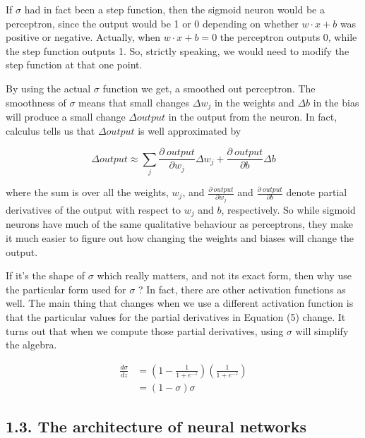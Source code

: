 \documentclass[12 pt]{article}
\begin{document}
If $ \sigma $ had in fact been a step function, then the sigmoid
neuron would be a perceptron, since the output would be 1 or 0 depending
on whether $ w \cdot x + b $ was positive or negative. Actually, when
$ w \cdot x + b = 0 $ the perceptron outputs 0, while the step
function outputs 1. So, strictly speaking, we would need to modify the
step function at that one point.

By using the actual $ \sigma $ function we get, a smoothed out
perceptron. The smoothness of $ \sigma $ means that small changes
$ \Delta w_j $ in the weights and $ \Delta b $ in the bias will
produce a small change $ \Delta output $ in the output from the
neuron. In fact, calculus tells us that $ \Delta output $ is well
approximated by

\begin{equation}
    \Delta output \approx \sum_j
    \frac {\partial \ output}{\partial w_j} \Delta w_j +
    \frac {\partial \ output}{\partial b} \Delta b
\end{equation}

where the sum is over all the weights, $ w_j $, and $
\frac{\partial \ output}{\partial w_j} $ and $
\frac{\partial \ output}{\partial b} $ denote partial derivatives of
the output with respect to $ w_j $ and $ b $, respectively. So
while sigmoid neurons have much of the same qualitative behaviour as
perceptrons, they make it much easier to figure out how changing the
weights and biases will change the output.

If it's the shape of $ \sigma $ which really matters, and not its
exact form, then why use the particular form used for $ \sigma $ ? In
fact, there are other activation functions as well. The main thing that
changes when we use a different activation function is that the
particular values for the partial derivatives in Equation (5) change. It
turns out that when we compute those partial derivatives, using $
\sigma $ will simplify the algebra.

\begin{equation}
    \begin{split}
        \frac{d\sigma}{dz} & = \left({1 - \frac{1}{1 + e ^ {-z}}}\right)
        \left(\frac{1}{1 + e ^ {-z}}\right)\\
        & = (1 - \sigma)\sigma
    \end{split}
\end{equation}

\subsection{1.3. The architecture of neural networks}
\label{the-architecture-of-neural-networks}
\end{document}

